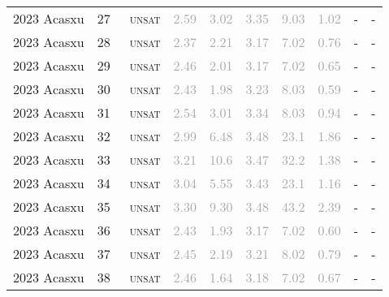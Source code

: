 \begin{center}
{\begin{longtable}{@{}llllllllll@{}}
2023 Acasxu & 27 & ~\textsc{unsat} & \textcolor{darkgray}{2.59} & \textcolor{darkgray}{3.02} & \textcolor{darkgray}{3.35} & \textcolor{darkgray}{9.03} & \textcolor{darkgray}{1.02} & - & - \\
2023 Acasxu & 28 & ~\textsc{unsat} & \textcolor{darkgray}{2.37} & \textcolor{darkgray}{2.21} & \textcolor{darkgray}{3.17} & \textcolor{darkgray}{7.02} & \textcolor{darkgray}{0.76} & - & - \\
2023 Acasxu & 29 & ~\textsc{unsat} & \textcolor{darkgray}{2.46} & \textcolor{darkgray}{2.01} & \textcolor{darkgray}{3.17} & \textcolor{darkgray}{7.02} & \textcolor{darkgray}{0.65} & - & - \\
2023 Acasxu & 30 & ~\textsc{unsat} & \textcolor{darkgray}{2.43} & \textcolor{darkgray}{1.98} & \textcolor{darkgray}{3.23} & \textcolor{darkgray}{8.03} & \textcolor{darkgray}{0.59} & - & - \\
2023 Acasxu & 31 & ~\textsc{unsat} & \textcolor{darkgray}{2.54} & \textcolor{darkgray}{3.01} & \textcolor{darkgray}{3.34} & \textcolor{darkgray}{8.03} & \textcolor{darkgray}{0.94} & - & - \\
2023 Acasxu & 32 & ~\textsc{unsat} & \textcolor{darkgray}{2.99} & \textcolor{darkgray}{6.48} & \textcolor{darkgray}{3.48} & \textcolor{darkgray}{23.1} & \textcolor{darkgray}{1.86} & - & - \\
2023 Acasxu & 33 & ~\textsc{unsat} & \textcolor{darkgray}{3.21} & \textcolor{darkgray}{10.6} & \textcolor{darkgray}{3.47} & \textcolor{darkgray}{32.2} & \textcolor{darkgray}{1.38} & - & - \\
2023 Acasxu & 34 & ~\textsc{unsat} & \textcolor{darkgray}{3.04} & \textcolor{darkgray}{5.55} & \textcolor{darkgray}{3.43} & \textcolor{darkgray}{23.1} & \textcolor{darkgray}{1.16} & - & - \\
2023 Acasxu & 35 & ~\textsc{unsat} & \textcolor{darkgray}{3.30} & \textcolor{darkgray}{9.30} & \textcolor{darkgray}{3.48} & \textcolor{darkgray}{43.2} & \textcolor{darkgray}{2.39} & - & - \\
2023 Acasxu & 36 & ~\textsc{unsat} & \textcolor{darkgray}{2.43} & \textcolor{darkgray}{1.93} & \textcolor{darkgray}{3.17} & \textcolor{darkgray}{7.02} & \textcolor{darkgray}{0.60} & - & - \\
2023 Acasxu & 37 & ~\textsc{unsat} & \textcolor{darkgray}{2.45} & \textcolor{darkgray}{2.19} & \textcolor{darkgray}{3.21} & \textcolor{darkgray}{8.02} & \textcolor{darkgray}{0.79} & - & - \\
2023 Acasxu & 38 & ~\textsc{unsat} & \textcolor{darkgray}{2.46} & \textcolor{darkgray}{1.64} & \textcolor{darkgray}{3.18} & \textcolor{darkgray}{7.02} & \textcolor{darkgray}{0.67} & - & - \\

\end{longtable}}
\end{center}
